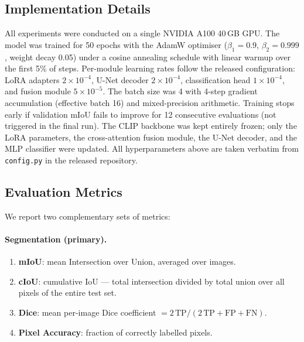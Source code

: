 \documentclass[remotesensing,article,accept,moreauthors,pdftex]{Definitions/mdpi}
\begin{document}
\subsection{Implementation Details}

All experiments were conducted on a single NVIDIA A100 40\,GB GPU. The model
was trained for 50 epochs with the AdamW optimiser
\cite{loshchilov2019decoupled} ($\beta_1=0.9$, $\beta_2=0.999$, weight decay
0.05) under a cosine annealing schedule with linear warmup over the first 5\%
of steps. Per-module learning rates follow the released configuration: LoRA
adapters $2\times10^{-4}$, U-Net decoder $2\times10^{-4}$, classification head
$1\times10^{-4}$, and fusion module $5\times10^{-5}$. The batch size was 4
with 4-step gradient accumulation (effective batch 16) and mixed-precision
arithmetic. Training stops early if validation mIoU fails to improve for 12
consecutive evaluations (not triggered in the final run). The CLIP backbone
was kept entirely frozen; only the LoRA parameters, the cross-attention fusion
module, the U-Net decoder, and the MLP classifier were updated. All
hyperparameters above are taken verbatim from \texttt{config.py} in the
released repository.

\subsection{Evaluation Metrics}

We report two complementary sets of metrics:

\paragraph{Segmentation (primary).}
\begin{enumerate}[label=(\roman*), leftmargin=*]
  \item \textbf{mIoU}: mean Intersection over Union, averaged over images.

  \item \textbf{cIoU}: cumulative IoU --- total intersection divided by total
        union over all pixels of the entire test set.

  \item \textbf{Dice}: mean per-image Dice coefficient
        $= 2\,\mathrm{TP}/(2\,\mathrm{TP}+\mathrm{FP}+\mathrm{FN})$.

  \item \textbf{Pixel Accuracy}: fraction of correctly labelled pixels.
\end{enumerate}
\end{document}
